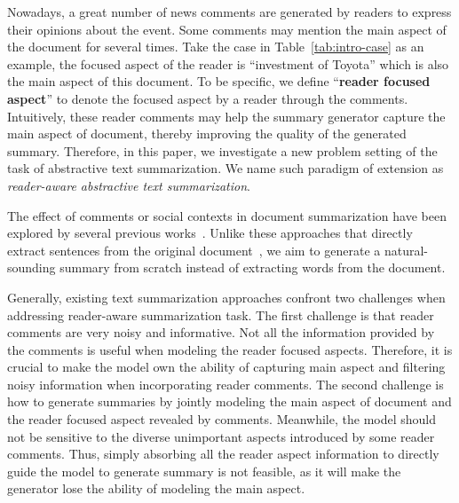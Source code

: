 \documentclass[letterpaper]{article} \usepackage{aaai19}  \usepackage{times}  \usepackage{helvet}  \usepackage{courier}
\begin{document}
Nowadays, a great number of news comments are generated by readers to express their opinions about the event. 
Some comments may mention the main aspect of the document for several times. 
Take the case in Table~\ref{tab:intro-case} as an example, the focused aspect of the reader is ``investment of Toyota'' which is also the main aspect of this document. 
To be specific, we define ``\textbf{reader focused aspect}'' to denote the focused aspect by a reader through the comments.
Intuitively, these reader comments may help the summary generator capture the main aspect of document, thereby improving the quality of the generated summary. 
Therefore, in this paper, we investigate a new problem setting of the task of abstractive text summarization.
We name such paradigm of extension as \emph{reader-aware abstractive text summarization}.




The effect of comments or social contexts in document summarization have been explored by several previous works~\cite{Hu2008CommentsorientedDS,Yang2011SocialCS,Li2015ReaderAwareMS,li2017reader}.
Unlike these approaches that directly extract sentences from the original document~\cite{Hu2008CommentsorientedDS,Yang2011SocialCS,Li2015ReaderAwareMS}, we aim to generate a natural-sounding summary from scratch instead of extracting words from the document.

Generally, existing text summarization approaches confront two challenges when addressing reader-aware summarization task.
The first challenge is that reader comments are very noisy and informative. 
Not all the information provided by the comments is useful when modeling the reader focused aspects. 
Therefore, it is crucial to make the model own the ability of capturing main aspect and filtering noisy information when incorporating reader comments. 
The second challenge is how to generate summaries by jointly modeling the main aspect of document and the reader focused aspect revealed by comments.
Meanwhile, the model should not be sensitive to the diverse unimportant aspects introduced by some reader comments. 
Thus, simply absorbing all the reader aspect information to directly guide the model to generate summary is not feasible, as it will make the generator lose the ability of modeling the main aspect.
\end{document}
